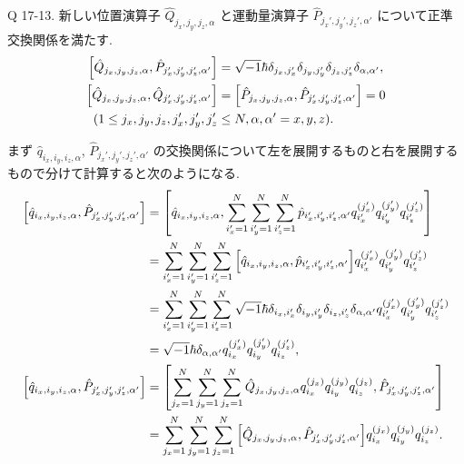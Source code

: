 \documentclass[uplatex,dvipdfmx,a4paper,11pt]{jlreq}
\theoremstyle{definition}
\begin{document}
\begin{itembox}[l]{Q 17-13.}
  新しい位置演算子 $\hat{Q}_{j_x,j_y,j_z,\alpha}$ と運動量演算子 $\hat{P}_{j_x',j_y',j_z',\alpha'}$ について正準交換関係を満たす.
  \begin{align}
    \qty[\hat{Q}_{j_x,j_y,j_z,\alpha}, \hat{P}_{j_x',j_y',j_z',\alpha'}] & = \sqrt{-1}\hbar\delta_{j_x,j_x'}\delta_{j_y,j_y'}\delta_{j_z,j_z'}\delta_{\alpha,\alpha'}, \\
    \qty[\hat{Q}_{j_x,j_y,j_z,\alpha}, \hat{Q}_{j_x',j_y',j_z',\alpha'}] & = \qty[\hat{P}_{j_x,j_y,j_z,\alpha}, \hat{P}_{j_x',j_y',j_z',\alpha'}] = 0                  \\
    (1\leq j_x,j_y,j_z,j_x',j_y',j_z'                                    & \leq N, \alpha,\alpha' = x,y,z).
  \end{align}
\end{itembox}
まず $\hat{q}_{i_x,i_y,i_z,\alpha}$, $\hat{P}_{j_x',j_y',j_z',\alpha'}$ の交換関係について左を展開するものと右を展開するもので分けて計算すると次のようになる.
\begin{align}
  \qty[\hat{q}_{i_x,i_y,i_z,\alpha}, \hat{P}_{j_x',j_y',j_z',\alpha'}] & = \qty[\hat{q}_{i_x,i_y,i_z,\alpha}, \sum_{i_x'=1}^{N}\sum_{i_y'=1}^{N}\sum_{i_z'=1}^{N}\hat{p}_{i_x',i_y',i_z',\alpha'}q_{i_x'}^{(j_x')}q_{i_y'}^{(j_y')}q_{i_z'}^{(j_z')}]                     \\
                                                                       & = \sum_{i_x'=1}^{N}\sum_{i_y'=1}^{N}\sum_{i_z'=1}^{N}\qty[\hat{q}_{i_x,i_y,i_z,\alpha}, \hat{p}_{i_x',i_y',i_z',\alpha'}]q_{i_x'}^{(j_x')}q_{i_y'}^{(j_y')}q_{i_z'}^{(j_z')}                     \\
                                                                       & = \sum_{i_x'=1}^{N}\sum_{i_y'=1}^{N}\sum_{i_z'=1}^{N}\sqrt{-1}\hbar\delta_{i_x,i_x'}\delta_{i_y,i_y'}\delta_{i_z,i_z'}\delta_{\alpha,\alpha'}q_{i_x'}^{(j_x')}q_{i_y'}^{(j_y')}q_{i_z'}^{(j_z')} \\
                                                                       & = \sqrt{-1}\hbar\delta_{\alpha,\alpha'}q_{i_x}^{(j_x')}q_{i_y}^{(j_y')}q_{i_z}^{(j_z')},                                                                                                         \\
  \qty[\hat{q}_{i_x,i_y,i_z,\alpha}, \hat{P}_{j_x',j_y',j_z',\alpha'}] & = \qty[\sum_{j_x=1}^{N}\sum_{j_y=1}^{N}\sum_{j_z=1}^{N}\hat{Q}_{j_x,j_y,j_z,\alpha}q_{i_x}^{(j_x)}q_{i_y}^{(j_y)}q_{i_z}^{(j_z)}, \hat{P}_{j_x',j_y',j_z',\alpha'}]                              \\
                                                                       & = \sum_{j_x=1}^{N}\sum_{j_y=1}^{N}\sum_{j_z=1}^{N}\qty[\hat{Q}_{j_x,j_y,j_z,\alpha}, \hat{P}_{j_x',j_y',j_z',\alpha'}]q_{i_x}^{(j_x)}q_{i_y}^{(j_y)}q_{i_z}^{(j_z)}.
\end{align}
\end{document}
